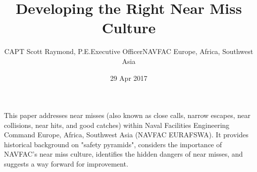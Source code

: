 \documentclass{tufte-handout}
\title{Developing the Right Near Miss Culture}
\author[CAPT Scott Raymond]{CAPT Scott Raymond, P.E.\newline Executive Officer\newline NAVFAC Europe, Africa, Southwest Asia}
\date{29 Apr 2017}  %
\begin{document}
	
	\maketitle%
	
	
	
	This paper addresses near misses (also known as close calls, narrow escapes, near collisions, near hits, and good catches) within Naval Facilities Engineering Command Europe, Africa, Southwest Asia (NAVFAC EURAFSWA).  It provides historical background on "safety pyramids", considers the importance of NAVFAC's near miss culture, identifies the hidden dangers of near misses, and suggests a way forward for improvement.
	
\end{document}
